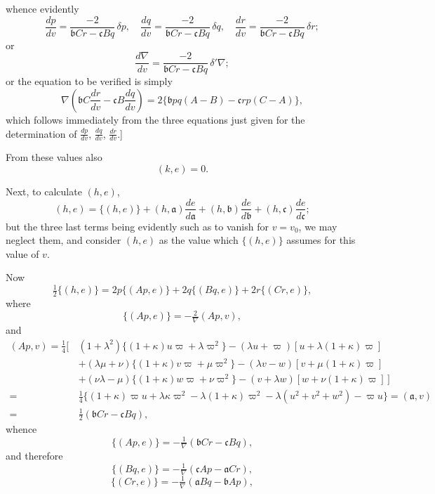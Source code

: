 \documentclass[11pt]{article}
\begin{document}
\newpage
\setcounter{page}{248}

whence evidently
\[
\frac{dp}{dv} = \frac{-2}{\mathfrak{b}Cr - \mathfrak{c}Bq}\,\delta p,\quad \frac{dq}{dv} = \frac{-2}{\mathfrak{b}Cr - \mathfrak{c}Bq}\,\delta q,\quad \frac{dr}{dv} = \frac{-2}{\mathfrak{b}Cr - \mathfrak{c}Bq}\,\delta r;
\]
or
\[
\frac{d\nabla}{dv} = \frac{-2}{\mathfrak{b}Cr - \mathfrak{c}Bq}\,\delta'\nabla;
\]
or the equation to be verified is simply
\[
\nabla\!\left(\mathfrak{b}C\frac{dr}{dv} - \mathfrak{c}B\frac{dq}{dv}\right) = 2\{\mathfrak{b}pq(A - B) - \mathfrak{c}rp(C - A)\},
\]
which follows immediately from the three equations just given for the determination of $\frac{dp}{dv}$, $\frac{dq}{dv}$, $\frac{dr}{dv}$.]

From these values also
\[
(k, e) = 0. \tag{49}
\]

Next, to calculate $(h, e)$,
\[
(h, e) = \{(h, e)\} + (h, \mathfrak{a})\frac{de}{d\mathfrak{a}} + (h, \mathfrak{b})\frac{de}{d\mathfrak{b}} + (h, \mathfrak{c})\frac{de}{d\mathfrak{c}};
\]
but the three last terms being evidently such as to vanish for $v = v_0$, we may neglect them, and consider $(h, e)$ as the value which $\{(h, e)\}$ assumes for this value of $v$.

Now
\[
\tfrac{1}{2}\{(h, e)\} = 2p\{(Ap, e)\} + 2q\{(Bq, e)\} + 2r\{(Cr, e)\},
\]
where
\[
\{(Ap, e)\} = -\tfrac{2}{\nabla}(Ap, v),
\]
and
\begin{align*}
(Ap, v) = \tfrac{1}{4}\big[\, & (1 + \lambda^2)\{(1 + \kappa)u\varpi + \lambda\varpi^2\} - (\lambda u + \varpi)[u + \lambda(1 + \kappa)\varpi] \\
& + (\lambda\mu + \nu)\{(1 + \kappa)v\varpi + \mu\varpi^2\} - (\lambda v - w)[v + \mu(1 + \kappa)\varpi] \\
& + (\nu\lambda - \mu)\{(1 + \kappa)w\varpi + \nu\varpi^2\} - (v + \lambda w)[w + \nu(1 + \kappa)\varpi]\,\big] \\
= {}&\tfrac{1}{4}\{(1 + \kappa)\varpi u + \lambda\kappa\varpi^2 - \lambda(1 + \kappa)\varpi^2 - \lambda(u^2 + v^2 + w^2) - \varpi u\} = (\mathfrak{a}, v) \\
= {}&\tfrac{1}{2}(\mathfrak{b}Cr - \mathfrak{c}Bq), \tag{50}
\end{align*}
whence
\[
\{(Ap, e)\} = -\tfrac{1}{\nabla}(\mathfrak{b}Cr - \mathfrak{c}Bq), \tag{51}
\]
and therefore
\[
\{(Bq, e)\} = -\tfrac{1}{\nabla}(\mathfrak{c}Ap - \mathfrak{a}Cr),
\]
\[
\{(Cr, e)\} = -\tfrac{1}{\nabla}(\mathfrak{a}Bq - \mathfrak{b}Ap),
\]
\end{document}
